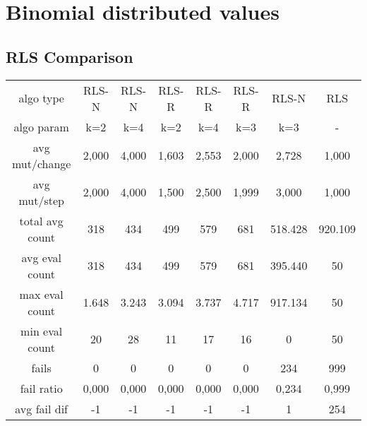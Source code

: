 \section{Binomial distributed values}

\subsection{RLS Comparison}

\begin{tabular}[h]{cccccccc}
algo type&          RLS-N&   RLS-N&   RLS-R&   RLS-R&   RLS-R&   RLS-N&     RLS\\
algo param&           k=2&     k=4&     k=2&     k=4&     k=3&     k=3&       -\\
avg mut/change&     2,000&   4,000&   1,603&   2,553&   2,000&   2,728&   1,000\\
avg mut/step&       2,000&   4,000&   1,500&   2,500&   1,999&   3,000&   1,000\\
\hline
total avg count&      318&     434&     499&     579&     681& 518.428& 920.109\\
avg eval count&       318&     434&     499&     579&     681& 395.440&      50\\
max eval count&     1.648&   3.243&   3.094&   3.737&   4.717& 917.134&      50\\
min eval count&        20&      28&      11&      17&      16&       0&      50\\
\hline
fails&                  0&       0&       0&       0&       0&     234&     999\\
fail ratio&         0,000&   0,000&   0,000&   0,000&   0,000&   0,234&   0,999\\
avg fail dif&          -1&      -1&      -1&      -1&      -1&       1&     254\\
\end{tabular}


